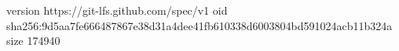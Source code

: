 version https://git-lfs.github.com/spec/v1
oid sha256:9d5aa7fe666487867e38d31a4dee41fb610338d6003804bd591024acb11b324a
size 174940
